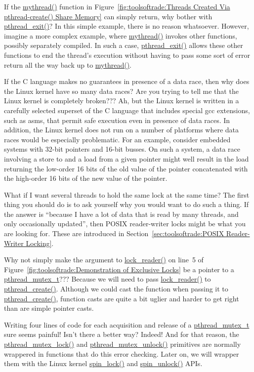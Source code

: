 \QuickQ{}
	If the \url{mythread()} function in
	Figure~\ref{fig:toolsoftrade:Threads Created Via pthread-create() Share Memory}
	can simply return, why bother with \url{pthread_exit()}?
\QuickA{}
	In this simple example, there is no reason whatsoever.
	However, imagine a more complex example, where \url{mythread()}
	invokes other functions, possibly separately compiled.
	In such a case, \url{pthread_exit()} allows these other functions
	to end the thread's execution without having to pass some sort
	of error return all the way back up to \url{mythread()}.

\QuickQ{}
	If the C language makes no guarantees in presence of a data
	race, then why does the Linux kernel have so many data races?
	Are you trying to tell me that the Linux kernel is completely
	broken???
\QuickA{}
	Ah, but the Linux kernel is written in a carefully selected
	superset of the C language that includes special gcc
	extensions, such as asms, that permit safe execution even
	in presence of data races.
	In addition, the Linux kernel does not run on a number of
	platforms where data races would be especially problematic.
	For an example, consider embedded systems with 32-bit pointers
	and 16-bit busses.
	On such a system, a data race involving a store to and a load
	from a given pointer might well result in the load returning the
	low-order 16 bits of the old value of the pointer concatenated
	with the high-order 16 bits of the new value of the pointer.

\QuickQ{}
	What if I want several threads to hold the same lock at the
	same time?
\QuickA{}
	The first thing you should do is to ask yourself why you would
	want to do such a thing.
	If the answer is ``because I have a lot of data that is read
	by many threads, and only occasionally updated'', then
	POSIX reader-writer locks might be what you are looking for.
	These are introduced in
	Section~\ref{sec:toolsoftrade:POSIX Reader-Writer Locking}.

\QuickQ{}
	Why not simply make the argument to \url{lock_reader()}
	on line~5 of
	Figure~\ref{fig:toolsoftrade:Demonstration of Exclusive Locks}
	be a pointer to a \url{pthread_mutex_t}???
\QuickA{}
	Because we will need to pass \url{lock_reader()} to
	\url{pthread_create()}.
	Although we could cast the function when passing it to
	\url{pthread_create()}, function casts are quite a bit
	uglier and harder to get right than are simple pointer casts.

\QuickQ{}
	Writing four lines of code for each acquisition and release
	of a \url{pthread_mutex_t} sure seems painful!
	Isn't there a better way?
\QuickA{}
	Indeed!
	And for that reason, the \url{pthread_mutex_lock()} and
	\url{pthread_mutex_unlock()} primitives are normally wrappered
	in functions that do this error checking.
	Later on, we will wrapper them with the Linux kernel
	\url{spin_lock()} and \url{spin_unlock()} APIs.

